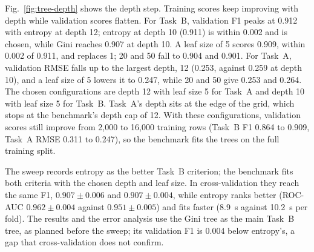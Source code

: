 \documentclass[10pt,twocolumn,a4paper]{article}
\begin{document}
Fig.~\ref{fig:tree-depth} shows the depth step. Training scores keep
improving with depth while validation scores flatten. For Task~B,
validation F1 peaks at 0.912 with entropy at depth 12; %
entropy at depth 10 (0.911) is within 0.002 and is chosen, %
while Gini reaches 0.907 at depth 10. %
A leaf size of 5 scores 0.909, within 0.002 of 0.911, and replaces 1; %
20 and 50 fall to 0.904 and 0.901. %
For Task~A, validation RMSE falls up to the largest depth, 12 (0.253, %
against 0.259 at depth 10), %
and a leaf size of 5 lowers it to 0.247, %
while 20 and 50 give 0.253 and 0.264. %
The chosen configurations are depth 12 with leaf size 5 for Task~A %
and depth 10 with leaf size 5 for Task~B. %
Task~A's depth sits at the edge of the grid, which stops at the
benchmark's depth cap of 12. %
With these configurations, validation scores still improve from 2{,}000
to 16{,}000 training rows (Task~B F1 0.864 to 0.909, Task~A RMSE 0.311 to %
0.247), so the benchmark fits the trees on the full training split.

The sweep records entropy as the better Task~B criterion; the benchmark %
fits both criteria with the chosen depth and leaf size. %
In cross-validation they reach the same F1, %
$0.907 \pm 0.006$ and $0.907 \pm 0.004$, %
while entropy ranks better (ROC-AUC $0.962 \pm 0.004$ %
against $0.951 \pm 0.005$) %
and fits faster (8.9~s against 10.2~s per fold). %
The results and the error analysis use the Gini tree as the main Task~B
tree, as planned before the sweep; its validation F1 is 0.004 below %
entropy's, a gap that cross-validation does not confirm.
\end{document}
